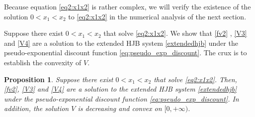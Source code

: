 \documentclass[11pt,reqno]{article}%
\newtheorem{proposition}[theorem]{Proposition}
\numberwithin{equation}{section}
\begin{document}
Because equation \eqref{eq2:x1x2} is rather complex, we will verify the existence of the solution $0<x_1<x_2$ to \eqref{eq2:x1x2} in the numerical analysis of the next section.


Suppose there exist  $0 < x_1 < x_2$  that solve \eqref{eq2:x1x2}. We show that \eqref{fv2} , \eqref{V3} and \eqref{V4} are a solution to the extended HJB system \eqref{extendedhjb} under the pseudo-exponential discount function \eqref{eq:pseudo_exp_discount}. The crux is to establish the convexity of $V$.

\begin{proposition}\label{convex2}
Suppose there exist  $0 < x_1 < x_2$ that solve \eqref{eq2:x1x2}. Then, \eqref{fv2}, \eqref{V3} and \eqref{V4} are a solution to the extended HJB system \eqref{extendedhjb} under the pseudo-exponential discount function \eqref{eq:pseudo_exp_discount}. In addition, the solution $V$ is decreasing and convex on $[0,+\infty)$.
\end{proposition}
\end{document}

